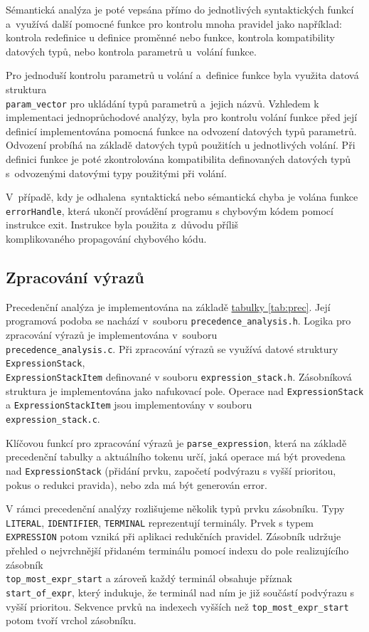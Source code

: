 \documentclass[11spt]{article}
\begin{document}
Sémantická analýza je poté vepsána přímo do jednotlivých syntaktických funkcí a~využívá
další pomocné funkce pro kontrolu mnoha pravidel jako například: kontrola redefinice u definice proměnné nebo funkce,
kontrola kompatibility datových typů, nebo kontrola parametrů u~volání funkce. 

Pro jednoduší kontrolu parametrů u volání a~definice funkce byla využita datová struktura \\ \texttt{param\_vector}
pro ukládání typů parametrů a~jejich názvů. Vzhledem k implementaci jednoprůchodové analýzy, byla pro kontrolu volání
funkce před její definicí implementována pomocná funkce na odvození datových typů parametrů.
Odvození probíhá na základě datových typů použitích u jednotlivých volání.
Při definici funkce je poté zkontrolována kompatibilita definovaných datových typů s~odvozenými datovými typy použitými při volání. 

V~případě, kdy je odhalena~syntaktická nebo sémantická chyba je volána funkce \texttt{errorHandle},
která ukončí provádění programu s chybovým kódem pomocí instrukce exit.
Instrukce byla použita z~důvodu příliš\\ komplikovaného propagování chybového kódu.

\subsection{Zpracování výrazů}
Precedenční analýza je implementována na základě \href{tab:prec}{tabulky \ref{tab:prec}}.
Její programová podoba se nachází v~souboru \texttt{precedence\_analysis.h}.
Logika pro zpracování výrazů je implementována v~souboru \\
\texttt{precedence\_analysis.c}.
Při zpracování výrazů se využívá datové struktury \texttt{ExpressionStack},\\ \texttt{ExpressionStackItem} definované v souboru
\texttt{expression\_stack.h}. Zásobníková struktura je implementována jako nafukovací pole.
Operace nad \texttt{ExpressionStack} a \texttt{ExpressionStackItem} jsou implementovány v souboru \\ \texttt{expression\_stack.c}.

Klíčovou funkcí pro zpracování výrazů je \texttt{parse\_expression}, která na základě precedenční tabulky a aktuálního tokenu určí, jaká operace
má být provedena nad \texttt{ExpressionStack} (přidání prvku, započetí podvýrazu s vyšší prioritou, pokus o redukci pravida), nebo zda má být generován error.


V rámci precedenční analýzy rozlišujeme několik typů prvku zásobníku. Typy \texttt{LITERAL}, \texttt{IDENTIFIER}, \texttt{TERMINAL} reprezentují terminály.
Prvek s typem \texttt{EXPRESSION} potom vzniká při aplikaci redukčních pravidel.
Zásobník udržuje přehled o nejvrchnější přidaném terminálu pomocí indexu do pole realizujícího zásobník\\ \texttt{top\_most\_expr\_start}
a zároveň každý terminál obsahuje příznak \texttt{start\_of\_expr}, který indukuje, že terminál nad ním je již součástí podvýrazu s vyšší prioritou.
Sekvence prvků na indexech vyšších než \texttt{top\_most\_expr\_start} potom tvoří vrchol zásobníku.
\end{document}
